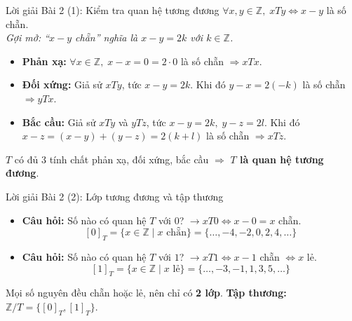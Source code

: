 \documentclass[12pt,a4paper]{article}
\begin{document}
\begin{baitap}{Lời giải Bài 2 (1): Kiểm tra quan hệ tương đương}
$\forall x, y \in \mathbb{Z},\; xTy \iff x - y$ là số chẵn.\\
\textit{Gợi mở: ``$x - y$ chẵn'' nghĩa là $x - y = 2k$ với $k \in \mathbb{Z}$.}
\begin{itemize}
  \item \textbf{Phản xạ:} $\forall x \in \mathbb{Z},\; x - x = 0 = 2 \cdot 0$ là số chẵn $\Rightarrow xTx$.
  \item \textbf{Đối xứng:} Giả sử $xTy$, tức $x - y = 2k$. Khi đó $y - x = 2(-k)$ là số chẵn $\Rightarrow yTx$.
  \item \textbf{Bắc cầu:} Giả sử $xTy$ và $yTz$, tức $x - y = 2k,\; y - z = 2l$. Khi đó $x - z = (x - y) + (y - z) = 2(k + l)$ là số chẵn $\Rightarrow xTz$.
\end{itemize}
$T$ có đủ $3$ tính chất phản xạ, đối xứng, bắc cầu $\Rightarrow$ \textbf{$T$ là quan hệ tương đương}.
\end{baitap}

\begin{baitap}{Lời giải Bài 2 (2): Lớp tương đương và tập thương}
\begin{itemize}
  \item \textbf{Câu hỏi:} Số nào có quan hệ $T$ với $0$? $\rightarrow xT0 \iff x - 0 = x$ chẵn.
  \[
    [0]_T = \{x \in \mathbb{Z} \mid x \text{ chẵn}\} = \{\dots, -4, -2, 0, 2, 4, \dots\}
  \]
  \item \textbf{Câu hỏi:} Số nào có quan hệ $T$ với $1$? $\rightarrow xT1 \iff x - 1$ chẵn $\iff x$ lẻ.
  \[
    [1]_T = \{x \in \mathbb{Z} \mid x \text{ lẻ}\} = \{\dots, -3, -1, 1, 3, 5, \dots\}
  \]
\end{itemize}

\begin{center}
\end{center}
Mọi số nguyên đều chẵn hoặc lẻ, nên chỉ có \textbf{2 lớp}. \textbf{Tập thương:} $\mathbb{Z}/T = \{[0]_T, [1]_T\}$.
\end{baitap}
\end{document}
